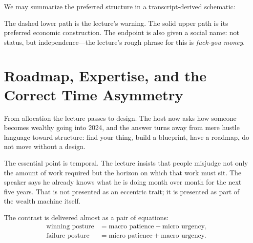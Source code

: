 We may summarize the preferred structure in a transcript-derived schematic:

\begin{figure}[h]
\centering
{}
\end{figure}

The dashed lower path is the lecture's warning. The solid upper path is its preferred economic construction. The endpoint is also given a social name: not status, but independence---the lecture's rough phrase for this is \emph{fuck-you money}.

\section{Roadmap, Expertise, and the Correct Time Asymmetry}

From allocation the lecture passes to design. The host now asks how someone becomes wealthy going into 2024, and the answer turns away from mere hustle language toward structure: find your thing, build a blueprint, have a roadmap, do not move without a design.

The essential point is temporal. The lecture insists that people misjudge not only the amount of work required but the horizon on which that work must sit. The speaker says he already knows what he is doing month over month for the next five years. That is not presented as an eccentric trait; it is presented as part of the wealth machine itself.

The contrast is delivered almost as a pair of equations:
\begin{align}
\text{winning posture} &= \text{macro patience} + \text{micro urgency},\\
\text{failure posture} &= \text{micro patience} + \text{macro urgency}.
\end{align}

